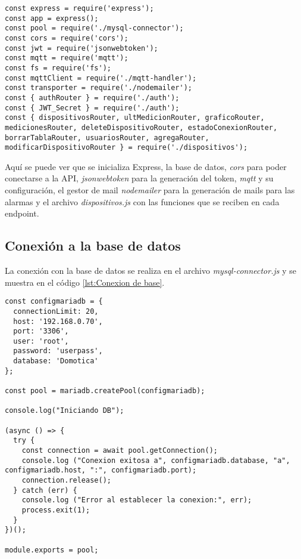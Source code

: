 \begin{lstlisting}[caption={Configuración de \textit{index.js}}, label={lst:Configuracion de index.js}]
const express = require('express');
const app = express();
const pool = require('./mysql-connector');
const cors = require('cors');
const jwt = require('jsonwebtoken');
const mqtt = require('mqtt');
const fs = require('fs');
const mqttClient = require('./mqtt-handler');
const transporter = require('./nodemailer');
const { authRouter } = require('./auth');
const { JWT_Secret } = require('./auth');
const { dispositivosRouter, ultMedicionRouter, graficoRouter, medicionesRouter, deleteDispositivoRouter, estadoConexionRouter, borrarTablaRouter, usuariosRouter, agregaRouter, modificarDispositivoRouter } = require('./dispositivos');
\end{lstlisting}

Aquí se puede ver que se inicializa Express, la base de datos, \textit{cors} para poder conectarse a la API, \textit{jsonwebtoken} para la generación del token, \textit{mqtt} y su configuración, el gestor de mail \textit{nodemailer} para la generación de mails para las alarmas y el archivo \textit{dispositivos.js} con las funciones que se reciben en cada endpoint.

\subsection{Conexión a la base de datos}

La conexión con la base de datos se realiza en el archivo \textit{mysql-connector.js} y se muestra en el código \ref{lst:Conexion de base}.

\begin{lstlisting}[caption={Conexión con la base de datos}, label={lst:Conexion de base}]
const configmariadb = {
  connectionLimit: 20,
  host: '192.168.0.70',
  port: '3306',
  user: 'root',
  password: 'userpass',
  database: 'Domotica'
};

const pool = mariadb.createPool(configmariadb);

console.log("Iniciando DB");

(async () => {
  try {
    const connection = await pool.getConnection();
    console.log ("Conexion exitosa a", configmariadb.database, "a", configmariadb.host, ":", configmariadb.port);
    connection.release();
  } catch (err) {
    console.log ("Error al establecer la conexion:", err);
    process.exit(1);
  }
})();

module.exports = pool;
\end{lstlisting}

